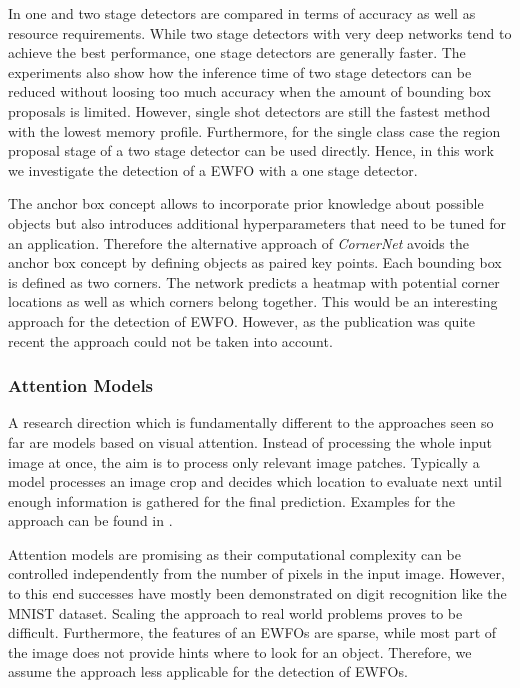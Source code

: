 In \cite{Huang} one and two stage detectors are compared in terms of accuracy as well as resource requirements. While two stage detectors with very deep networks tend to achieve the best performance, one stage detectors are generally faster. The experiments also show how the inference time of two stage detectors can be reduced without loosing too much accuracy when the amount of bounding box proposals is limited. However, single shot detectors are still the fastest method with the lowest memory profile. Furthermore, for the single class case the region proposal stage of a two stage detector can be used directly. Hence, in this work we investigate the detection of a \ac{EWFO} with a one stage detector. 

The anchor box concept allows to incorporate prior knowledge about possible objects but also introduces additional hyperparameters that need to be tuned for an application. Therefore the alternative approach of \textit{CornerNet}\cite{Law2018} avoids the anchor box concept by defining objects as paired key points. Each bounding box is defined as two corners. The network predicts a heatmap with potential corner locations as well as which corners belong together. This would be an interesting approach for the detection of \ac{EWFO}. However, as the publication was quite recent the approach could not be taken into account. 

\subsubsection{Attention Models}

A research direction which is fundamentally different to the approaches seen so far are models based on visual attention. Instead of processing the whole input image at once, the aim is to process only relevant image patches. Typically a model processes an image crop and decides which location to evaluate next until enough information is gathered for the final prediction. Examples for the approach can be found in \cite{Itti1998,Ba2014,Ablavatski2017a}.

Attention models are promising as their computational complexity can be controlled independently from the number of pixels in the input image. However, to this end successes have mostly been demonstrated on digit recognition like the MNIST dataset. Scaling the approach to real world problems proves to be difficult. Furthermore, the features of an \acp{EWFO} are sparse, while most part of the image does not provide hints where to look for an object. Therefore, we assume the approach less applicable for the detection of \acp{EWFO}.

